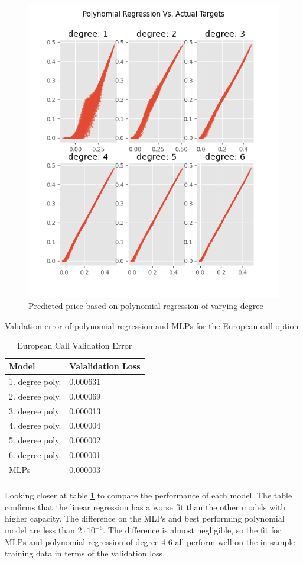 \begin{figure}[H]
\centering
\includegraphics{Figures/polynomialEuroC.png}
\decoRule
\caption[Polynomial Regression Predictions Vs. Actual Prices]{Predicted price based on polynomial regression of varying degree}
\label{fig:PolynomialEuroC}
\end{figure}

\begin{table}[th]
\caption{European Call Validation Error}{Validation error of polynomial regression and MLPs for the European call option}
\label{tab:euroPerformance}
\centering
\begin{tabular}{l l}
\toprule
\textbf{Model} & \textbf{Valalidation Loss} \\
\midrule
1. degree  poly. & 0.000631 \\
2. degree  poly.  & 0.000069 \\
3. degree poly & 0.000013\\
4. degree poly.  & 0.000004 \\
5. degree poly.  & 0.000002 \\
6. degree poly. & 0.000001\\
MLPs        & 0.000003\\
\bottomrule\\
\end{tabular}
\end{table}
Looking closer at table \ref{tab:euroPerformance} to compare the performance of each model. The table confirms that the linear regression has a worse fit than the other models with higher capacity. The difference on the MLPs and best performing polynomial model are less than $2\cdot 10^{-6}$. The difference is almost negligible, so the fit for MLPs and polynomial regression of degree 4-6 all perform well on the in-sample training data in terms of the validation loss.

